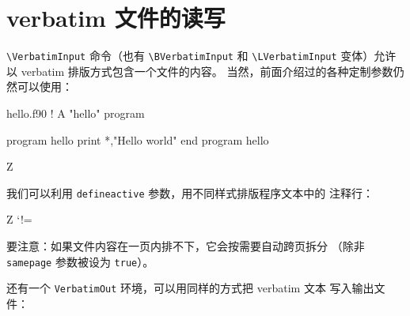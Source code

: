 \documentclass[twoside]{article}
\newcommand\cs[1]{\texttt{\textbackslash#1}}
\begin{document}
\clearpage

\section{verbatim 文件的读写}
\label{sec:VerbatimInclude}

  \cs{VerbatimInput} 命令（也有 \cs{BVerbatimInput} 和
\cs{LVerbatimInput} 变体）允许以 verbatim 排版方式包含一个文件的内容。
当然，前面介绍过的各种定制参数仍然可以使用：


\typeout{*************************************}
\typeout{*************************************}

\begin{VerbatimOut}{hello.f90}
  ! A "hello" program

  program hello
    print *,"Hello world"
  end program hello
\end{VerbatimOut}

\begin{SideBySideExample}
  Z



\end{SideBySideExample}

  我们可以利用 \texttt{defineactive} 参数，用不同样式排版程序文本中的
注释行：

\begin{SideBySideExample}
  Z
  \def\ExclamationPoint{\char33}
  \catcode`!=\active
  \VerbatimInput%
    [defineactive=%
      \def!{\color{cyan}\itshape
        \ExclamationPoint}]
    {hello.f90}
\end{SideBySideExample}

  要注意：如果文件内容在一页内排不下，它会按需要自动跨页拆分
（除非 \texttt{samepage} 参数被设为 \texttt{true}）。

  还有一个 \verb+VerbatimOut+ 环境，可以用同样的方式把 verbatim 文本
写入输出文件：
\end{document}
